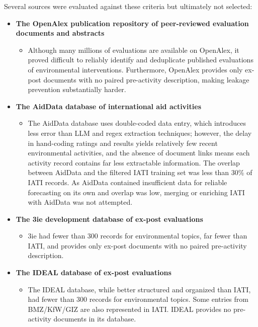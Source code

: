 \documentclass[12pt,a4paper]{article}
\let\citep\parencite
\begin{document}
Several sources were evaluated against these criteria but ultimately not selected:
\begin{itemize}
\item \textbf{The OpenAlex publication repository of peer-reviewed evaluation documents and abstracts} \citep{priemOpenAlexFullyopenIndex2022}
\begin{itemize}
\item Although many millions of evaluations are available on OpenAlex, it proved difficult to reliably identify and deduplicate published evaluations of environmental interventions. Furthermore, OpenAlex provides only ex-post documents with no paired pre-activity description, making leakage prevention substantially harder.
\end{itemize}
\item \textbf{The AidData database of international aid activities} \citep{tierneyMoreDollarsSense2011}
\begin{itemize}
\item The AidData database uses double-coded data entry, which introduces less error than LLM and regex extraction techniques; however, the delay in hand-coding ratings and results yields relatively few recent environmental activities, and the absence of document links means each activity record contains far less extractable information. The overlap between AidData and the filtered IATI training set was less than 30\% of IATI records. As AidData contained insufficient data for reliable forecasting on its own and overlap was low, merging or enriching IATI with AidData was not attempted.
\end{itemize}
\item \textbf{The 3ie development database of ex-post evaluations} \citep{3ieDevelopmentEvidence}
\begin{itemize}
\item 3ie had fewer than 300 records for environmental topics, far fewer than IATI, and provides only ex-post documents with no paired pre-activity description.
\end{itemize}
\item \textbf{The IDEAL database of ex-post evaluations} \citep{kfwdevelopmentbankIDEaL}
\begin{itemize}
\item The IDEAL database, while better structured and organized than IATI, had fewer than 300 records for environmental topics. Some entries from BMZ/KfW/GIZ are also represented in IATI. IDEAL provides no pre-activity documents in its database.
\end{itemize}
\end{itemize}
\end{document}
